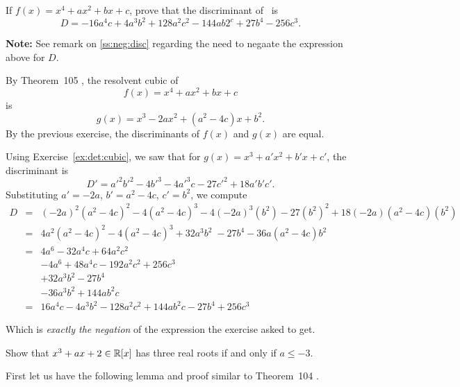 \begin{myenumerate}
\item
\begin{excopy}
If
\label{ex:disc:quat}
\(f(x) = x^4 + ax^2 + bx + c\), prove that the discriminant of \fx\ is
\begin{equation*}
 D = -16a^4c + 4a^3b^2 + 128a^2c^2  - 144ab2^c + 27b^4 -256c^3.
\end{equation*}
\end{excopy}

\textbf{Note:} See remark on \ref{ss:neg:disc} regarding
the need to negaate the expression above for $D$.

By Theorem~105 \cite{Rotman98},
the resolvent cubic of
\[f(x) = x^4 + ax^2 + bx + c\]
is \[g(x) = x^3 - 2ax^2 + (a^2-4c)x + b^2.\]
By the previous exercise, the discriminants of \(f(x)\) and \(g(x)\)
are equal.

Using Exercise~\ref{ex:det:cubic},
we saw that for
\(g(x) = x^3 + a'x^2 + b'x + c'\), the discriminant is
   \begin{equation*}
      D' = a'^2b'^2 - 4b'^3 - 4a'^3c - 27c'^2 + 18a'b'c'.
   \end{equation*}
Substituting
\(a' = -2a\),\quad
\(b' = a^2-4c\),\quad
\(c' = b^2\),
we compute
\begin{eqnarray*}
D
& = & (-2a)^2(a^2-4c)^2 - 4(a^2-4c)^3 - 4(-2a)^3(b^2)
      - 27(b^2)^2 + 18(-2a)(a^2-4c)(b^2) \\
& = & 4a^2(a^2-4c)^2 - 4(a^2-4c)^3 + 32a^3b^2 \;
      - 27b^4 - 36a(a^2-4c)b^2 \\
& = & 4a^6 - 32a^4c + 64a^2c^2 \\
&   &   -4a^6 + 48a^4c - 192a^2c^2 + 256c^3 \\
&   &   + 32a^3b^2 - 27b^4 \\
&   &   - 36a^3b^2 + 144ab^2c \\
& = & 16a^4c - 4a^3b^2 - 128a^2c^2 + 144ab^2c - 27b^4 + 256c^3
\end{eqnarray*}

Which is \emph{exactly the negation} of the expression
the exercise asked to get.

\item
\begin{excopy}Show that \(x^3 + ax + 2\in \mathbb{R}[x]\) has three real roots
if and only if \(a\leq -3\).
\end{excopy}

First let us have the following lemma and proof
similar to Theorem~104 \cite{Rotman98}.



\end{myenumerate}
